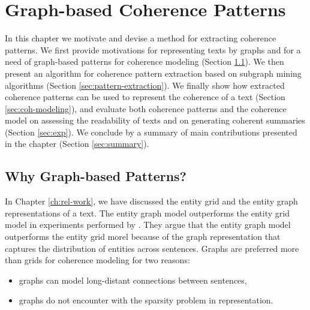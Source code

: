 
\chapter{Graph-based Coherence Patterns}
\label{ch:coh-patterns}

In this chapter we motivate and devise a method for extracting coherence patterns.  
We first provide motivations for representing texts by graphs and for a need of graph-based patterns for coherence modeling (Section \ref{sec:motivation}).  
We then present an algorithm for coherence pattern extraction based on subgraph mining algorithms (Section \ref{sec:pattern-extraction}). 
We finally show how extracted coherence patterns can be used to represent the coherence of a text (Section \ref{sec:coh-modeling}), and evaluate both coherence patterns and the coherence model on assessing the readability of texts and on generating coherent summaries (Section \ref{sec:exp}). 
We conclude by a summary of main contributions presented in the chapter (Section \ref{sec:summary}). 

\section{Why Graph-based Patterns?}
\label{sec:motivation}

In Chapter \ref{ch:rel-work}, we have discussed the entity grid \cite{barzilay05,barzilay08a} and the entity graph \cite{guinaudeau13} representations of a text. 
The entity graph model outperforms the entity grid model in experiments performed by . 
They argue that the entity graph model outperforms the entity grid morel because of the graph representation that captures the distribution of entities across sentences. 
Graphs are preferred more than grids for coherence modeling for two reasons:

\begin{itemize}

	\item graphs can model long-distant connections between sentences,

	\item graphs do not encounter with the sparsity problem in representation. 

\end{itemize}

